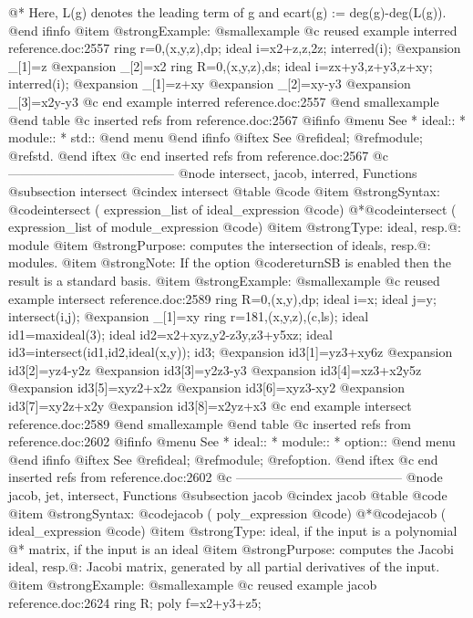 {@*
Here, L(g) denotes the leading term of g and ecart(g) := deg(g)-deg(L(g)).
@end ifinfo
@item @strong{Example:}
@smallexample
@c reused example interred reference.doc:2557 
  ring r=0,(x,y,z),dp;
  ideal i=x2+z,z,2z;
  interred(i);
@expansion{} _[1]=z
@expansion{} _[2]=x2
  ring R=0,(x,y,z),ds;
  ideal i=zx+y3,z+y3,z+xy;
  interred(i);
@expansion{} _[1]=z+xy
@expansion{} _[2]=xy-y3
@expansion{} _[3]=x2y-y3
@c end example interred reference.doc:2557
@end smallexample
@end table
@c inserted refs from reference.doc:2567
@ifinfo
@menu
See
* ideal::
* module::
* std::
@end menu
@end ifinfo
@iftex
See
@ref{ideal};
@ref{module};
@ref{std}.
@end iftex
@c end inserted refs from reference.doc:2567
@c ---------------------------------------
@node intersect, jacob, interred, Functions
@subsection intersect
@cindex intersect
@table @code
@item @strong{Syntax:}
@code{intersect (} expression_list of ideal_expression @code{)}
@*@code{intersect (} expression_list of module_expression @code{)}
@item @strong{Type:}
ideal, resp.@: module
@item @strong{Purpose:}
computes the intersection of ideals, resp.@: modules.
@item @strong{Note:}
If the option @code{returnSB} is enabled then the result is a standard basis.
@item @strong{Example:}
@smallexample
@c reused example intersect reference.doc:2589 
  ring R=0,(x,y),dp;
  ideal i=x;
  ideal j=y;
  intersect(i,j);
@expansion{} _[1]=xy
  ring r=181,(x,y,z),(c,ls);
  ideal id1=maxideal(3);
  ideal id2=x2+xyz,y2-z3y,z3+y5xz;
  ideal id3=intersect(id1,id2,ideal(x,y));
  id3;
@expansion{} id3[1]=yz3+xy6z
@expansion{} id3[2]=yz4-y2z
@expansion{} id3[3]=y2z3-y3
@expansion{} id3[4]=xz3+x2y5z
@expansion{} id3[5]=xyz2+x2z
@expansion{} id3[6]=xyz3-xy2
@expansion{} id3[7]=xy2z+x2y
@expansion{} id3[8]=x2yz+x3
@c end example intersect reference.doc:2589
@end smallexample
@end table
@c inserted refs from reference.doc:2602
@ifinfo
@menu
See
* ideal::
* module::
* option::
@end menu
@end ifinfo
@iftex
See
@ref{ideal};
@ref{module};
@ref{option}.
@end iftex
@c end inserted refs from reference.doc:2602
@c ---------------------------------------
@node jacob, jet, intersect, Functions
@subsection jacob
@cindex jacob
@table @code
@item @strong{Syntax:}
@code{jacob (} poly_expression @code{)}
@*@code{jacob (} ideal_expression @code{)}
@item @strong{Type:}
ideal, if the input is a polynomial
@* matrix, if the input is an ideal
@item @strong{Purpose:}
computes the Jacobi ideal, resp.@: Jacobi matrix, generated by all
partial derivatives of the input.
@item @strong{Example:}
@smallexample
@c reused example jacob reference.doc:2624 
  ring R;
  poly f=x2+y3+z5;
}
